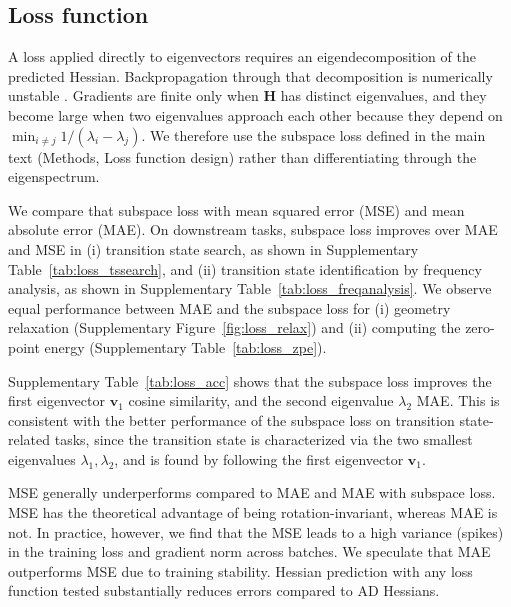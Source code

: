 \documentclass[pdflatex,sn-mathphys-num]{sn-jnl}%
\begin{document}
\subsection{Loss function\label{sec:lossablation}}
A loss applied directly to eigenvectors requires an eigendecomposition of the predicted Hessian. Backpropagation through that decomposition is numerically unstable \citep{aaComputationEigenvalueEigenvector2007}. Gradients are finite only when $\mathbf{H}$ has distinct eigenvalues, and they become large when two eigenvalues approach each other because they depend on $\min_{i \neq j} 1/(\lambda_i - \lambda_j)$. We therefore use the subspace loss defined in the main text (Methods, Loss function design) rather than differentiating through the eigenspectrum.

We compare that subspace loss with mean squared error (MSE) and mean absolute error (MAE).
On downstream tasks, subspace loss improves over MAE and MSE in (i) transition state search, as shown in Supplementary Table~\ref{tab:loss_tssearch}, and (ii) transition state identification by frequency analysis, as shown in Supplementary Table~\ref{tab:loss_freqanalysis}. We observe equal performance between MAE and the subspace loss for (i) geometry relaxation (Supplementary Figure~\ref{fig:loss_relax}) and (ii) computing the zero-point energy (Supplementary Table~\ref{tab:loss_zpe}).

Supplementary Table~\ref{tab:loss_acc} shows that the subspace loss improves the first eigenvector $\bm{v}_1$ cosine similarity, and the second eigenvalue $\lambda_2$ MAE. This is consistent with the better performance of the subspace loss on transition state-related tasks, since the transition state is characterized via the two smallest eigenvalues $\lambda_1, \lambda_2$, and is found by following the first eigenvector $\bm{v}_1$.

MSE generally underperforms compared to MAE and MAE with subspace loss.
MSE has the theoretical advantage of being rotation-invariant, whereas MAE is not.
In practice, however, we find that the MSE leads to a high variance (spikes) in the training loss and gradient norm across batches. We speculate that MAE outperforms MSE due to training stability.
Hessian prediction with any loss function tested substantially reduces errors compared to AD Hessians.
\end{document}
